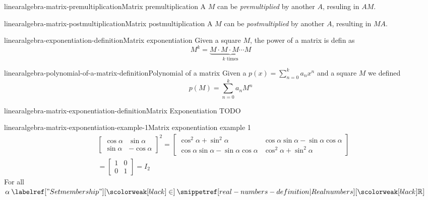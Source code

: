 \documentclass[preview]{standalone}
\begin{document}
\begin{snippetdefinition}{linearalgebra-matrix-premultiplication}{Matrix premultiplication}
    A \matrix \(M\) can be \textit{premultiplied}
    by another \matrix \(A\), resuling in \(AM\).
\end{snippetdefinition}

\begin{snippetdefinition}{linearalgebra-matrix-postmultiplication}{Matrix postmultiplication}
    A \matrix \(M\) can be \textit{postmultiplied}
    by another \matrix \(A\), resulting in \(MA\).
\end{snippetdefinition}

\begin{snippetdefinition}{linearalgebra-exponentiation-definition}{Matrix exponentiation}
    Given a square \matrix \(M\), the power of a matrix
    is defin as
    \[
        M^k = \underbrace{M\cdot M \cdot M \cdots M}_{k \text{ times}}
    \]
\end{snippetdefinition}

\begin{snippetdefinition}{linearalgebra-polynomial-of-a-matrix-definition}{Polynomial of a matrix}
    Given a \polynomial \(p(x)=\sum_{n=0}^k a_nx^n\)
    and a square \matrix \(M\) we defined
    \[
        p(M) = \sum_{n=0}^k a_nM^n
    \]
\end{snippetdefinition}

\begin{snippetdefinition}{linearalgebra-matrix-exponentiation-definition}{Matrix Exponentiation}
    TODO
\end{snippetdefinition}

\begin{snippetexample}{linearalgebra-matrix-exponentiation-example-1}{Matrix exponentiation example 1}
    \begin{align*}
        & {\begin{bmatrix}
            \cos\alpha & \sin\alpha \\
            \sin\alpha & -\cos\alpha
        \end{bmatrix}}^2
        = \begin{bmatrix}
            \cos^2\alpha + \sin^2\alpha & \cos\alpha\sin\alpha - \sin\alpha\cos\alpha \\
            \cos\alpha\sin\alpha - \sin\alpha\cos\alpha & \cos^2\alpha + \sin^2\alpha
        \end{bmatrix}
        \\
        &= \begin{bmatrix}
            1 & 0 \\
            0 & 1
        \end{bmatrix} = I_2
    \end{align*}
    For all \(\alpha \in \realnumbers\)
\end{snippetexample}
\end{document}
